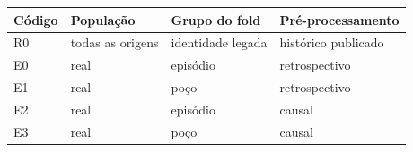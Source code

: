 \begin{tabular}{llll}
\toprule
Código & População & Grupo do fold & Pré-processamento \\
\midrule
R0 & todas as origens & identidade legada & histórico publicado \\
E0 & real & episódio & retrospectivo \\
E1 & real & poço & retrospectivo \\
E2 & real & episódio & causal \\
E3 & real & poço & causal \\
\bottomrule
\end{tabular}
